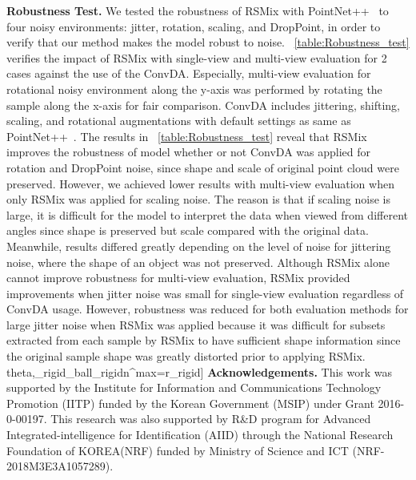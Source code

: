\documentclass[final]{cvpr}
\begin{document}
\noindent \textbf{Robustness Test.} We tested the robustness of RSMix with PointNet++~\cite{qi2017pointnet++} to four noisy environments: jitter, rotation, scaling, and DropPoint, in order to verify that our method makes the model robust to noise. \tablename~\ref{table:Robustness_test} verifies the impact of RSMix with single-view and multi-view evaluation for 2 cases against the use of the ConvDA. Especially, multi-view evaluation for rotational noisy environment along the y-axis was performed by rotating the sample along the x-axis for fair comparison. ConvDA includes jittering, shifting, scaling, and rotational augmentations with default settings as same as PointNet++~\cite{qi2017pointnet++}. The results in \tablename~\ref{table:Robustness_test} reveal that RSMix improves the robustness of model whether or not ConvDA was applied for rotation and DropPoint noise, since shape and scale of original point cloud were preserved. However, we achieved lower results with multi-view evaluation when only RSMix was applied for scaling noise. The reason is that if scaling noise is large, it is difficult for the model to interpret the data when viewed from different angles since shape is preserved but scale compared with the original data. Meanwhile, results differed greatly depending on the level of noise for jittering noise, where the shape of an object was not preserved. Although RSMix alone cannot improve robustness for multi-view evaluation, RSMix provided improvements when jitter noise was small for single-view evaluation regardless of ConvDA usage. However, robustness was reduced for both evaluation methods for large jitter noise when RSMix was applied because it was difficult for subsets extracted from each sample by RSMix to have sufficient shape information since the original sample shape was greatly distorted prior to applying RSMix.\\theta\theta,\thetar_{rigid}_{ball}\theta\theta\thetar_{rigid}n^{max}=r_{rigid}]
\noindent \textbf{Acknowledgements.} 
This work was supported by the Institute for Information and Communications Technology Promotion (IITP) funded by the Korean Government (MSIP) under Grant 2016-0-00197. This research was also supported by R\&D program for Advanced Integrated-intelligence for Identification (AIID) through the National Research Foundation of KOREA(NRF) funded by Ministry of Science and ICT (NRF-2018M3E3A1057289).


\newpage

{\small


}
\end{document}
